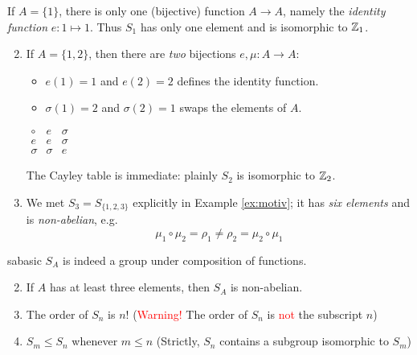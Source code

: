 \begin{examples}{}{}
	\exstart If $A=\{1\}$, there is only one (bijective) function $A\to A$, namely the \emph{identity function} $e:1\mapsto 1$. Thus $S_1$ has only one element and is isomorphic to $\mathbb{Z}_1$.
	\begin{enumerate}\setcounter{enumi}{1}\itemsep0pt
	  \item If $A=\{1,2\}$, then there are \emph{two} bijections $e,\mu:A\to A$:\par
	  \begin{minipage}[t]{0.7\linewidth}\vspace{-10pt}
	    \begin{itemize}\itemsep0pt
	    	\item $e(1)=1$ and $e(2)=2$ defines the identity function.
	    	\item $\sigma(1)=2$ and $\sigma(2)=1$ swaps the elements of $A$.
	  	\end{itemize}
	  \end{minipage}\hfill\begin{minipage}[t]{0.29\linewidth}\vspace{-18pt}
	  \flushright%
	  $\begin{array}{c||c|c}
	  	\circ&e&\sigma\\\hline\hline
	 	 	e&e&\sigma\\\hline
	  	\sigma&\sigma&e
	  \end{array}$
	  \end{minipage}\par
	
	  The Cayley table is immediate: plainly $S_2$ is isomorphic to $\mathbb{Z}_2$.
	  
	  \item We met $S_3=S_{\{1,2,3\}}$ explicitly in Example \ref{ex:motiv}; it has \emph{six elements} and is \emph{non-abelian}, e.g.
	  \[
	  	\mu_1\circ\mu_2=\rho_1\neq \rho_2=\mu_2\circ\mu_1
	  \]
	\end{enumerate}
\end{examples}

\begin{lemm}{}{sabasic}
	\exstart $S_A$ is indeed a group under composition of functions.\vspace{-4pt}
	\begin{enumerate}\setcounter{enumi}{1}\itemsep0pt
	  \item If $A$ has at least three elements, then $S_A$ is non-abelian.
	  \item The order of $S_n$ is $n!$ \hfill (\textcolor{red}{Warning!} The order of $S_n$ is \textcolor{red}{not} the subscript $n$)
	  \item $S_m\le S_n$ whenever $m\le n$ \hfill(Strictly, $S_n$ contains a subgroup isomorphic to $S_m$)
	\end{enumerate}
\end{lemm}

